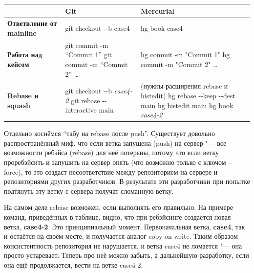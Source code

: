 \documentclass[10pt, a5paper]{article}
\begin{document}
\begin{table}
  \centering
  \begin{tabular}{P{2.5cm}|P{3.5cm}|P{3.5cm}}
    \hline
                                  ~  & \textbf{Git}                 & \textbf{Mercurial}          \\ \hline
    \textbf{Ответвление от mainline} & git checkout -{}-b case4       & hg book case4              \\
    \textbf{Работа над кейсом}   & git commit -m ``Commit 1'' \newline
                                   git commit -m ``Commit 2'' \ldots{}
                                                                    & hg commit -m "Commit 1" \newline
                                                                      hg commit -m "Commit 2" \ldots{} \\
    \textbf{Rebase и squash}     & git checkout -{}-b \emph{case4-2} \newline
                                   git rebase -{}-interactive main
                                                     & (нужны расширения rebase и histedit) \newline
                                                       hg rebase -{}-keep -{}-dest main \newline
                                                       hg histedit main \newline
                                                       hg book \emph{case4-2}      \\
    \hline
  \end{tabular}
\end{table}
Отдельно коснёмся ``табу на rebase после push''. Существует довольно распространённый миф, что если ветка запушена (push) на сервер "--- все возможности ребэйса (rebase) для неё потеряны, потому что если ветку проребэйсить и запушить на сервер опять (что возможно только с ключом --force), то это создаст несоответствие между репозиторием на сервере и репозиториями других разработчиков. В результате эти разработчики при попытке подтянуть эту ветку с сервера получат сломанную ветку.

На самом деле rebase возможен, если выполнять его правильно. На примере команд, приведённых в таблице, видно, что при ребэйсинге создаётся новая ветка, \textbf{case4-2}. Это принципиальный момент. Первоначальная ветка, \textbf{case4}, так и остаётся на своём месте, и получается аналог copy-on-write. Таким образом консистентность репозитория не нарушается, и ветка case4 не ломается "--- она просто устаревает. Теперь про неё можно забыть, а дальнейшую разработку, если она ещё продолжается, вести на ветке case4-2.
\end{document}
